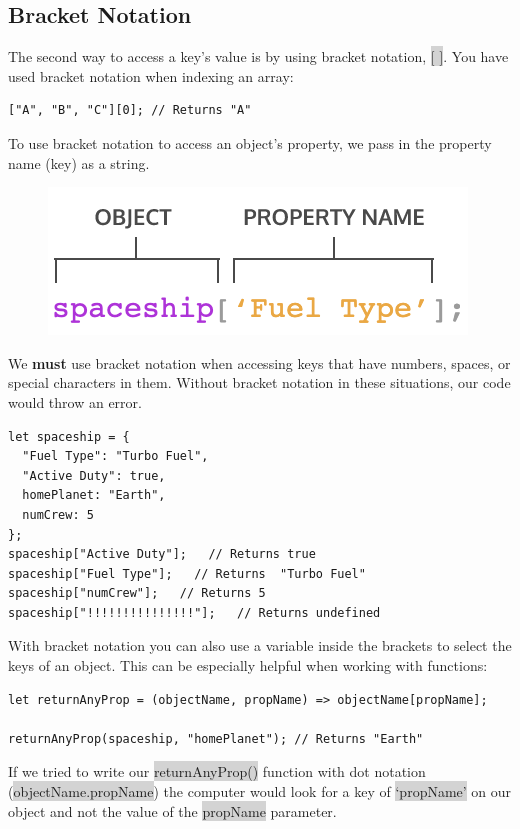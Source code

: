 \documentclass[11pt]{article}
\begin{document}
\subsection{Bracket Notation}
The second way to access a key’s value is by using bracket notation, \colorbox{lightgray}{$[$ $]$}. You have used bracket notation when indexing an array:
\begin{lstlisting}
["A", "B", "C"][0]; // Returns "A"
\end{lstlisting}
To use bracket notation to access an object’s property, we pass in the property name (key) as a string.
\begin{figure}[H]
\includegraphics[scale = 0.7]{10_3}
\centering
\end{figure}
We \textbf{must} use bracket notation when accessing keys that have numbers, spaces, or special characters in them. Without bracket notation in these situations, our code would throw an error.
\begin{lstlisting}
let spaceship = {
  "Fuel Type": "Turbo Fuel",
  "Active Duty": true,
  homePlanet: "Earth",
  numCrew: 5
};
spaceship["Active Duty"];   // Returns true
spaceship["Fuel Type"];   // Returns  "Turbo Fuel"
spaceship["numCrew"];   // Returns 5
spaceship["!!!!!!!!!!!!!!!"];   // Returns undefined
\end{lstlisting}
With bracket notation you can also use a variable inside the brackets to select the keys of an object. This can be especially helpful when working with functions:
\begin{lstlisting}
let returnAnyProp = (objectName, propName) => objectName[propName];

returnAnyProp(spaceship, "homePlanet"); // Returns "Earth"
\end{lstlisting}
If we tried to write our \colorbox{lightgray}{returnAnyProp()} function with dot notation (\colorbox{lightgray}{objectName.propName}) the computer would look for a key of \colorbox{lightgray}{`propName'} on our object and not the value of the \colorbox{lightgray}{propName} parameter.
\end{document}
